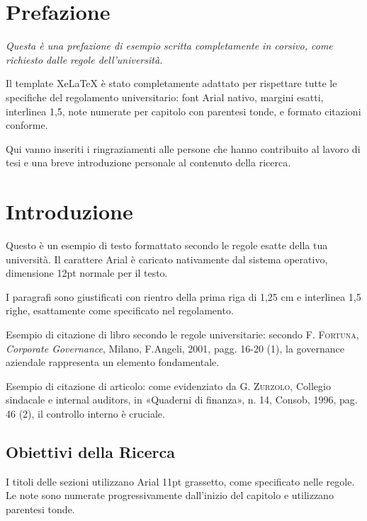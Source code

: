 \documentclass[12pt,a4paper,oneside]{book}
\newcommand{\autore}[1]{\textsc{#1}}
\newcommand{\citlibro}[6]{%
    \autore{#1}, \textit{#2}, #3, #4, #5, pagg. #6%
}
\newcommand{\citarticolo}[7]{%
    \autore{#1}, #2, in «#3», n. #4, #5, #6, pag. #7%
}
\newenvironment{prefazione}
    {\chapter*{Prefazione}
     \addcontentsline{toc}{chapter}{Prefazione}
     \itshape}  %
    {\normalfont\clearpage}
\begin{document}
\begin{prefazione}
Questa è una prefazione di esempio scritta completamente in corsivo, come richiesto dalle regole dell'università.

Il template XeLaTeX è stato completamente adattato per rispettare tutte le specifiche del regolamento universitario: font Arial nativo, margini esatti, interlinea 1,5, note numerate per capitolo con parentesi tonde, e formato citazioni conforme.

Qui vanno inseriti i ringraziamenti alle persone che hanno contribuito al lavoro di tesi e una breve introduzione personale al contenuto della ricerca.
\end{prefazione}


\chapter{Introduzione}

Questo è un esempio di testo formattato secondo le regole esatte della tua università. Il carattere Arial è caricato nativamente dal sistema operativo, dimensione 12pt normale per il testo.

I paragrafi sono giustificati con rientro della prima riga di 1,25 cm e interlinea 1,5 righe, esattamente come specificato nel regolamento.

Esempio di citazione di libro secondo le regole universitarie: secondo \citlibro{F. Fortuna}{Corporate Governance}{Milano}{F.Angeli}{2001}{16-20}(1), la governance aziendale rappresenta un elemento fondamentale.

Esempio di citazione di articolo: come evidenziato da \citarticolo{G. Zurzolo}{Collegio sindacale e internal auditors}{Quaderni di finanza}{14}{Consob}{1996}{46}(2), il controllo interno è cruciale.

\section{Obiettivi della Ricerca}

I titoli delle sezioni utilizzano Arial 11pt grassetto, come specificato nelle regole. Le note sono numerate progressivamente dall'inizio del capitolo e utilizzano parentesi tonde.
\end{document}
